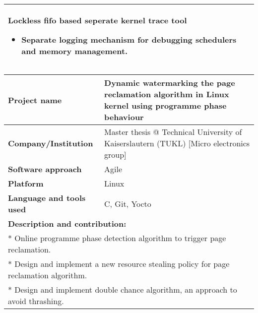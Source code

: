 \documentclass[letterpaper]{twentysecondcv} %
\begin{document}
\begin{tabular}{ |p{20cm}| }
 \vspace{1mm}
 {\large\textbf{ Lockless fifo based seperate kernel trace tool}}
 \vspace{2mm}
 \begin{itemize}
 \item  Separate logging mechanism for debugging schedulers and memory management.
 \end{itemize} \\    
 \hline
  
\end{tabular}

\vspace{6mm}

\begin{tabular}{ |p{7cm}|p{13cm}| }
 \hline

\rowcolor{sidecolor} 
\textbf{{\large Project name}} & \textbf{Dynamic watermarking the page reclamation algorithm in Linux kernel using programme phase behaviour}\\[2ex]
 \hline
\rowcolor{sidecolor}
\textbf{{\large Company/Institution}} & Master thesis @ Technical University of Kaiserslautern (TUKL) [Micro electronics group]\\[2ex]
 \hline
 \textbf{{\large Software approach}} & Agile \\[2ex]
 \hline
 \textbf{{\large Platform}} & Linux \\[2ex]
 \hline
  \textbf{{\large Language and tools used}} & C, Git, Yocto \\[2ex]
 \hline
 
 \multicolumn{2}{l}{
 \textbf{\large Description and contribution:}} \\[2ex]
 \multicolumn{2}{l}{
 	* Online programme phase detection algorithm to trigger page reclamation.}\\
 \multicolumn{2}{l}{
 	* Design and implement a new resource stealing policy for page reclamation algorithm.}\\
 \multicolumn{2}{l}{
 	* Design and implement double chance algorithm, an approach to avoid thrashing.
 }\\
 \hline
 \hline
 \end{tabular}
 
 \vspace{6mm}
 
\end{document}
